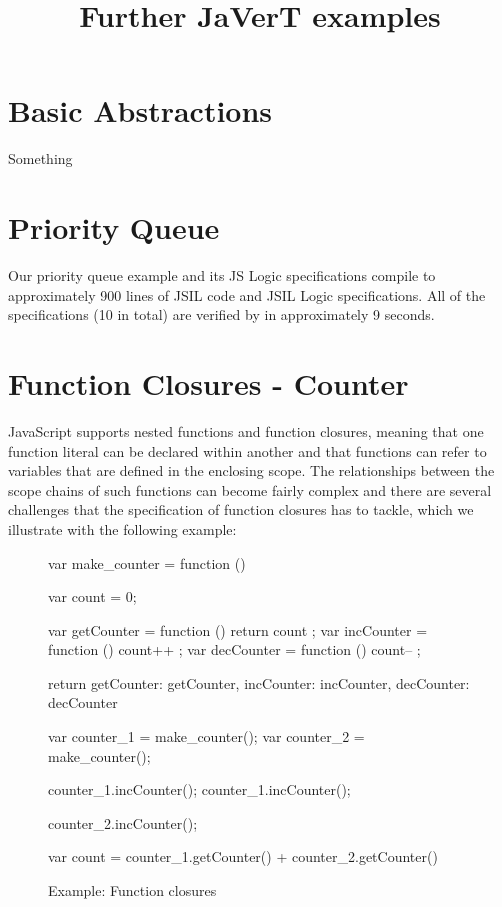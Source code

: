\documentclass{llncs}
\begin{document}
\title{Further JaVerT examples}



\maketitle

\section{Basic Abstractions}
Something

\newpage
\section{Priority Queue}
\label{sec:closures}

Our priority queue example and its JS Logic specifications compile to approximately 900 lines of JSIL code and JSIL Logic specifications. All of the specifications (10 in total) are verified by \javert in approximately 9 seconds. 

\newpage
\section{Function Closures - Counter}
\label{sec:closures}

JavaScript supports nested functions and function closures, meaning that one function literal can be declared within another and that functions can refer to variables that are defined in the enclosing scope. 
The relationships between the scope chains of such functions can become fairly complex and there are several challenges that the specification of function closures has to tackle, which we illustrate with the following example:

\begin{figure}[!h]
\centering
\begin{minipage}{0.75\textwidth}
\begin{lstjs}[firstnumber=1]
var make_counter = function () {
   var count = 0;

   var getCounter = function () { return count };
   var incCounter = function () { count++ };
   var decCounter = function () { count-- };

   return { getCounter: getCounter, incCounter: incCounter, decCounter: decCounter }
}

var counter_1 = make_counter();
var counter_2 = make_counter();

counter_1.incCounter();
counter_1.incCounter();

counter_2.incCounter();

var count = counter_1.getCounter() + counter_2.getCounter()
\end{lstjs}
\end{minipage}
\vspace*{-0.2cm}
\caption{Example: Function closures}
\label{fig:fc}
\end{figure}
\end{document}
